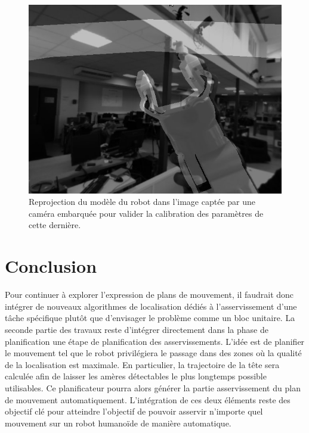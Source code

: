 \begin{figure}
  \begin{center}
    \includegraphics[width=.95\linewidth]{src/chap3-primitive-mouvement/calibextrinsic.jpg}
  \end{center}
  \caption{Reprojection du modèle du robot dans l'image captée par une
    caméra embarquée pour valider la calibration des paramètres de
    cette dernière. \label{fig:reprojection_modele_vision}}
\end{figure}


\section{Conclusion}

Pour continuer à explorer l'expression de plans de mouvement, il
faudrait donc intégrer de nouveaux algorithmes de localisation dédiés
à l'asservissement d'une tâche spécifique plutôt que d'envisager le
problème comme un bloc unitaire. La seconde partie des travaux reste
d'intégrer directement dans la phase de planification une étape de
planification des asservissements. L'idée est de planifier le
mouvement tel que le robot privilégiera le passage dans des zones où
la qualité de la localisation est maximale. En particulier, la
trajectoire de la tête sera calculée afin de laisser les amères
détectables le plus longtemps possible utilisables. Ce planificateur
pourra alors générer la partie asservissement du plan de mouvement
automatiquement. L'intégration de ces deux éléments reste des objectif
clé pour atteindre l'objectif de pouvoir asservir n'importe quel
mouvement sur un robot humanoïde de manière automatique.
